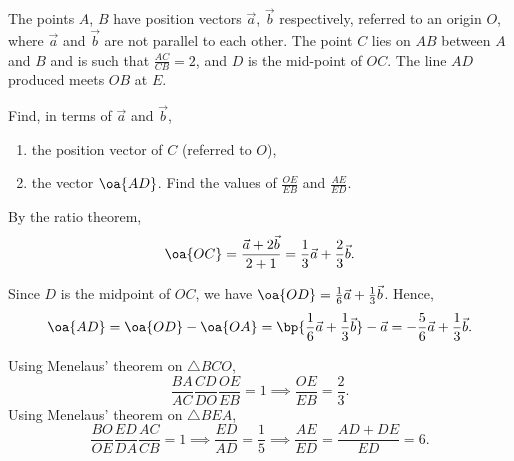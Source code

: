 \begin{problem}
    The points $A$, $B$ have position vectors $\vec a$, $\vec b$ respectively, referred to an origin $O$, where $\vec a$ and $\vec b$ are not parallel to each other. The point $C$ lies on $AB$ between $A$ and $B$ and is such that $\frac{AC}{CB} = 2$, and $D$ is the mid-point of $OC$. The line $AD$ produced meets $OB$ at $E$.

    Find, in terms of $\vec a$ and $\vec b$,

    \begin{enumerate}
        \item the position vector of $C$ (referred to $O$),
        \item the vector $\oa{AD}$. Find the values of $\frac{OE}{EB}$ and $\frac{AE}{ED}$.
    \end{enumerate}
\end{problem}
\begin{solution}
    \begin{ppart}
        By the ratio theorem, \[\oa{OC} = \frac{\vec a + 2\vec b}{2 + 1} = \frac13 \vec a + \frac23 \vec b.\]
    \end{ppart}
    \begin{ppart}
        Since $D$ is the midpoint of $OC$, we have $\oa{OD} = \frac16 \vec a + \frac13 \vec b$. Hence, \[\oa{AD} = \oa{OD} - \oa{OA} = \bp{\frac16 \vec a + \frac13 \vec b} - \vec a = -\frac56 \vec a + \frac13 \vec b.\]
        
        Using Menelaus' theorem on $\triangle BCO$, \[\frac{BA}{AC} \frac{CD}{DO} \frac{OE}{EB} = 1 \implies \frac{OE}{EB} = \frac23.\] Using Menelaus' theorem on $\triangle BEA$, \[\frac{BO}{OE} \frac{ED}{DA} \frac{AC}{CB} = 1 \implies \frac{ED}{AD} = \frac15 \implies \frac{AE}{ED} = \frac{AD + DE}{ED} = 6.\]
    \end{ppart}
\end{solution}

